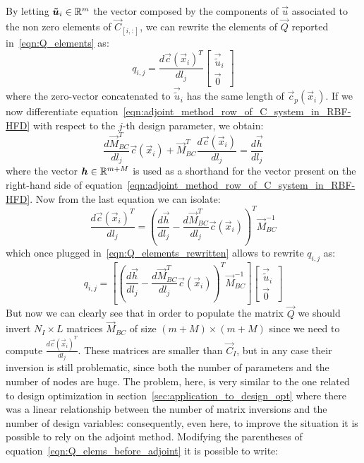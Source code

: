By letting $\boldsymbol{\tilde{u}}_i \in \mathbb{R}^m$ the vector composed by the components of $\vec{u}$ associated to the non zero elements of $\vec{C}_{[i,:]}$, we can rewrite the elements of $\vec{Q}$ reported in~\eqref{eqn:Q_elements} as:
\begin{equation}
	\label{eqn:Q_elements_rewritten}
	q_{i,j} =
	\frac{d\vec{c}(\vec{x}_i)^T}{dl_j}
	\begin{bmatrix}
		\vec{\tilde{u}}_i  \\
		\vec{0}
	\end{bmatrix}
\end{equation}
where the zero-vector concatenated to $\vec{\tilde{u}}_i$ has the same length of $\vec{c}_p(\vec{x}_i)$.
If we now differentiate equation~\eqref{eqn:adjoint_method_row_of_C_system_in_RBF-HFD} with respect to the $j$-th design parameter, we obtain:
\begin{equation}
	\frac{d \vec{M}_{BC}^T}{d l_j} \vec{c}(\vec{x}_i) + \vec{M}_{BC}^T \frac{d \vec{c}(\vec{x}_i)}{d l_j} = \frac{d \vec{h}}{d l_j}
\end{equation}
where the vector $\boldsymbol{h} \in \mathbb{R}^{m+M}$ is used as a shorthand for the vector present on the right-hand side of equation~\eqref{eqn:adjoint_method_row_of_C_system_in_RBF-HFD}. Now from the last equation we can isolate:
\begin{equation}
	\frac{d \vec{c}(\vec{x}_i)^T}{dl_j} = \left( \frac{d \vec{h}}{d l_j} - \frac{d \vec{M}_{BC}^T}{d l_j} \vec{c}(\vec{x}_i) \right)^T \vec{M}_{BC}^{-1}
\end{equation}
which once plugged in~\eqref{eqn:Q_elements_rewritten} allows to rewrite $q_{i,j}$ as:
\begin{equation}
	\label{eqn:Q_elems_before_adjoint}
	q_{i,j} =
	\left[ \left( \frac{d \vec{h}}{d l_j} - \frac{d \vec{M}_{BC}^T}{d l_j} \vec{c}(\vec{x}_i) \right)^T \vec{M}_{BC}^{-1} \right]
	\begin{bmatrix}
		\vec{\tilde{u}}_i  \\
		\vec{0}
	\end{bmatrix}
\end{equation}
But now we can clearly see that in order to populate the matrix $\vec{Q}$ we should invert $N_I \times L$ matrices $\vec{M}_{BC}$ of size $(m+M) \times (m+M)$ since we need to compute $\frac{d \vec{c}(\vec{x}_i)^T}{dl_j}$. These matrices are smaller than $\vec{C}_I$, but in any case their inversion is still problematic, since both the number of parameters and the number of nodes are huge. The problem, here, is very similar to the one related to design optimization in section~\ref{sec:application_to_design_opt} where there was a linear relationship between the number of matrix inversions and the number of design variables: consequently, even here, to improve the situation it is possible to rely on the adjoint method. Modifying the parentheses of equation~\eqref{eqn:Q_elems_before_adjoint} it is possible to write:
